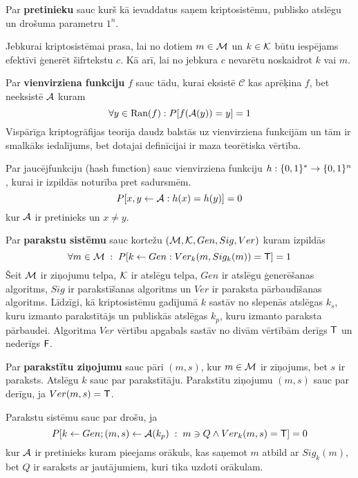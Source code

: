 Par \textbf{pretinieku} sauc \ppt{}  kurš kā ievaddatus saņem kriptosistēmu, publisko atslēgu un drošuma parametru $1^n$.

Jebkurai kriptosistēmai prasa, lai no dotiem $m\in\mathcal{M}$ un $k\in\mathcal{K}$ būtu iespējams efektīvi ģenerēt šifrtekstu $c$. Kā arī, lai no jebkura $c$ nevarētu noskaidrot $k$ vai $m$.

Par \textbf{vienvirziena funkciju} $f$ sauc tādu, kurai eksistē \ppt{} $\mathcal{C}$ kas aprēķina $f$, bet neeksistē \ppt{} $\mathcal{A}$ kuram 
$$ \forall y \in \text{Ran}(f): P[f(\mathcal{A}(y)) = y] = 1 $$
Vispārīga kriptogrāfijas teorija daudz balstās uz vienvirziena funkcijām un tām ir smalkāks iedalījums, bet dotajai definīcijai ir maza teorētiska vērtība.

Par jaucējfunkciju (hash function) sauc vienvirziena funkciju $h: \{0,1\}^* \to \{0,1\}^n$, kurai ir izpildās noturība pret sadursmēm. 
\begin{equation*}
    P[x, y \leftarrow \mathcal{A} : h(x) = h(y)] = 0
\end{equation*}
kur $\mathcal{A}$ ir pretinieks un $x\neq y$.

Par \textbf{parakstu sistēmu} sauc kortežu $(\mathcal{M}, \mathcal{K}, Gen, Sig, Ver)$ kuram izpildās
\begin{equation*}
    \forall m \in \mathcal{M} \;:\; P[k \leftarrow Gen: Ver_k(m, Sig_k(m))=\textsf{T}] = 1
\end{equation*}
Šeit $\mathcal{M}$ ir ziņojumu telpa, $\mathcal{K}$ ir atslēgu telpa, $Gen$ ir atslēgu ģenerēšanas algoritms, $Sig$ ir parakstīšanas algoritms un $Ver$ ir paraksta pārbaudīšanas algoritms. Līdzīgi, kā kriptosistēmu gadījumā $k$ sastāv no slepenās atslēgas $k_s$, kuru izmanto parakstītājs un publiskās atslēgas $k_p$, kuru izmanto paraksta pārbaudei. Algoritma $Ver$ vērtību apgabals sastāv no divām vērtībām \textemdash{} derīgs $\textsf{T}$ un nederīgs $\textsf{F}$.

Par \textbf{parakstītu ziņojumu} sauc pāri $(m, s)$, kur $m\in \mathcal{M}$ ir ziņojums, bet $s$ ir paraksts. Atslēgu $k$ sauc par parakstītāju. Parakstītu ziņojumu $(m,s)$ sauc par derīgu, ja $Ver(m,s) =\textsf{T}$.

Parakstu sistēmu sauc par drošu, ja
\begin{equation*}
    P[k \leftarrow Gen; (m,s) \leftarrow \mathcal{A} (k_p)\;:\; m\ni Q \wedge Ver_k(m,s) =\textsf{T}] = 0
\end{equation*}
kur $\mathcal{A}$ ir pretinieks kuram pieejams orākuls, kas saņemot $m$ atbild ar $Sig_k(m)$, bet $Q$ ir saraksts ar jautājumiem, kuri tika uzdoti orākulam.\cite[p.~135]{pass10}

